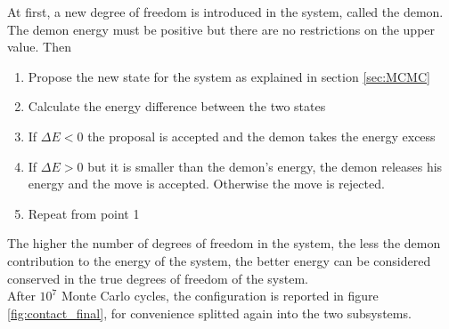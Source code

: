At first, a new degree of freedom is introduced in the system, called the demon. The demon energy must be positive but there are no restrictions on the upper value. Then
\begin{enumerate}
    \item Propose the new state for the system as explained in section \ref{sec:MCMC}
    \item Calculate the energy difference between the two states
    \item If $\Delta E < 0$ the proposal is accepted and the demon takes the energy excess
    \item If $\Delta E > 0$ but it is smaller than the demon's energy, the demon releases his energy and the move is accepted. Otherwise the move is rejected.
    \item Repeat from point 1
\end{enumerate}
The higher the number of degrees of freedom in the system, the less the demon contribution to the energy of the system, the better energy can be considered conserved in the true degrees of freedom of the system. \\
After $10^7$ Monte Carlo cycles, the configuration is reported in figure \ref{fig:contact_final}, for convenience splitted again into the two subsystems.
